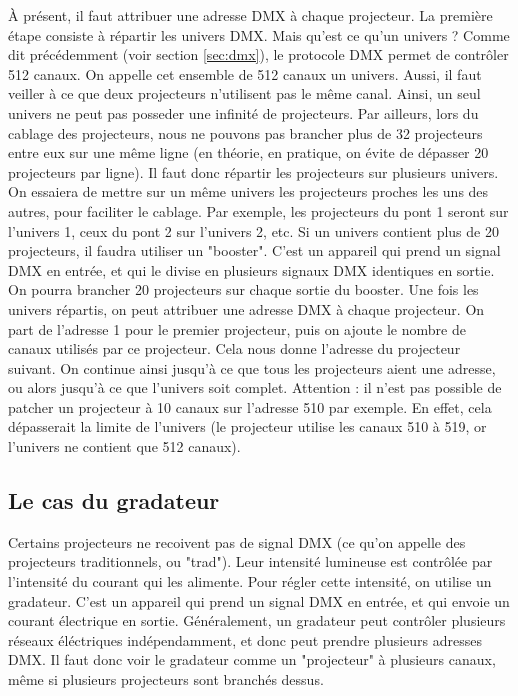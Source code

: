 À présent, il faut attribuer une adresse DMX à chaque projecteur.
La première étape consiste à répartir les univers DMX. Mais qu'est ce qu'un univers ?
\newline
Comme dit précédemment (voir section \ref{sec:dmx}), le protocole DMX permet de contrôler 512 canaux. On appelle cet ensemble de 512 canaux un univers.
Aussi, il faut veiller à ce que deux projecteurs n'utilisent pas le même canal.
Ainsi, un seul univers ne peut pas posseder une infinité de projecteurs.
Par ailleurs, lors du cablage des projecteurs, nous ne pouvons pas brancher plus de 32 projecteurs entre eux sur une même ligne (en théorie, en pratique, on évite de dépasser 20 projecteurs par ligne).
Il faut donc répartir les projecteurs sur plusieurs univers.
\newline
\newline
On essaiera de mettre sur un même univers les projecteurs proches les uns des autres, pour faciliter le cablage.
Par exemple, les projecteurs du pont 1 seront sur l'univers 1, ceux du pont 2 sur l'univers 2, etc.
\newline
Si un univers contient plus de 20 projecteurs, il faudra utiliser un "booster". C'est un appareil qui prend un signal DMX en entrée, et qui le divise en plusieurs signaux DMX identiques en sortie.
On pourra brancher 20 projecteurs sur chaque sortie du booster.
\newline
\newline
Une fois les univers répartis, on peut attribuer une adresse DMX à chaque projecteur.
On part de l'adresse 1 pour le premier projecteur, puis on ajoute le nombre de canaux utilisés par ce projecteur.
Cela nous donne l'adresse du projecteur suivant.
On continue ainsi jusqu'à ce que tous les projecteurs aient une adresse, ou alors jusqu'à ce que l'univers soit complet.
\newline
Attention : il n'est pas possible de patcher un projecteur à 10 canaux sur l'adresse 510 par exemple. En effet, cela dépasserait la limite de l'univers (le projecteur utilise les canaux 510 à 519, or l'univers ne contient que 512 canaux).

\subsection{Le cas du gradateur}
\label{subsec:patch_gradateur}

Certains projecteurs ne recoivent pas de signal DMX (ce qu'on appelle des projecteurs traditionnels, ou "trad"). Leur intensité lumineuse est contrôlée par l'intensité du courant qui les alimente.
Pour régler cette intensité, on utilise un gradateur. C'est un appareil qui prend un signal DMX en entrée, et qui envoie un courant électrique en sortie.
Généralement, un gradateur peut contrôler plusieurs réseaux éléctriques indépendamment, et donc peut prendre plusieurs adresses DMX. Il faut donc voir le gradateur comme un "projecteur" à plusieurs canaux, même si plusieurs projecteurs sont branchés dessus.

